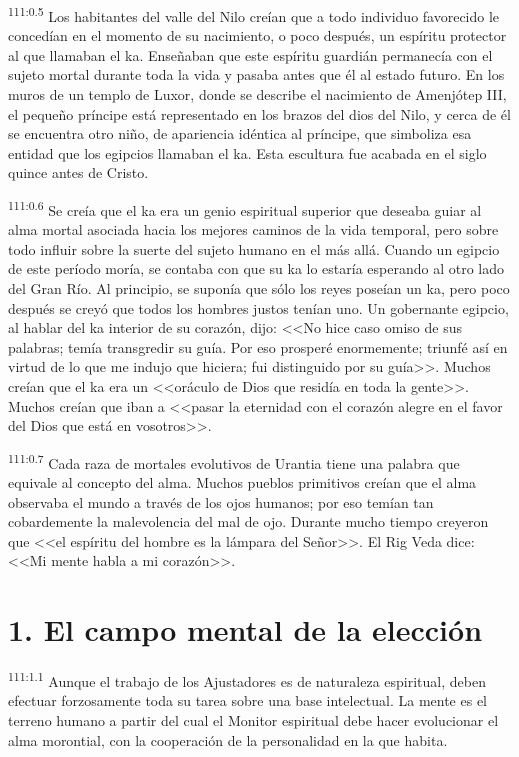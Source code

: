 \par
\textsuperscript{111:0.5} Los habitantes del valle del Nilo creían que a todo individuo favorecido le concedían en el momento de su nacimiento, o poco después, un espíritu protector al que llamaban el ka. Enseñaban que este espíritu guardián permanecía con el sujeto mortal durante toda la vida y pasaba antes que él al estado futuro. En los muros de un templo de Luxor, donde se describe el nacimiento de Amenjótep III, el pequeño príncipe está representado en los brazos del dios del Nilo, y cerca de él se encuentra otro niño, de apariencia idéntica al príncipe, que simboliza esa entidad que los egipcios llamaban el ka. Esta escultura fue acabada en el siglo quince antes de Cristo.

\par
\textsuperscript{111:0.6} Se creía que el ka era un genio espiritual superior que deseaba guiar al alma mortal asociada hacia los mejores caminos de la vida temporal, pero sobre todo influir sobre la suerte del sujeto humano en el más allá. Cuando un egipcio de este período moría, se contaba con que su ka lo estaría esperando al otro lado del Gran Río. Al principio, se suponía que sólo los reyes poseían un ka, pero poco después se creyó que todos los hombres justos tenían uno. Un gobernante egipcio, al hablar del ka interior de su corazón, dijo: <<No hice caso omiso de sus palabras; temía transgredir su guía. Por eso prosperé enormemente; triunfé así en virtud de lo que me indujo que hiciera; fui distinguido por su guía>>. Muchos creían que el ka era un <<oráculo de Dios que residía en toda la gente>>. Muchos creían que iban a <<pasar la eternidad con el corazón alegre en el favor del Dios que está en vosotros>>.

\par
\textsuperscript{111:0.7} Cada raza de mortales evolutivos de Urantia tiene una palabra que equivale al concepto del alma. Muchos pueblos primitivos creían que el alma observaba el mundo a través de los ojos humanos; por eso temían tan cobardemente la malevolencia del mal de ojo. Durante mucho tiempo creyeron que <<el espíritu del hombre es la lámpara del Señor>>. El Rig Veda dice: <<Mi mente habla a mi corazón>>.

\section*{1. El campo mental de la elección}
\par
\textsuperscript{111:1.1} Aunque el trabajo de los Ajustadores es de naturaleza espiritual, deben efectuar forzosamente toda su tarea sobre una base intelectual. La mente es el terreno humano a partir del cual el Monitor espiritual debe hacer evolucionar el alma morontial, con la cooperación de la personalidad en la que habita.

